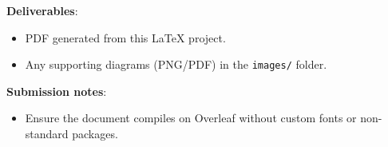 \textbf{Deliverables}:
\begin{itemize}
  \item PDF generated from this \LaTeX{} project.
  \item Any supporting diagrams (PNG/PDF) in the \texttt{images/} folder.
\end{itemize}

\textbf{Submission notes}:
\begin{itemize}
  \item Ensure the document compiles on Overleaf without custom fonts or non-standard packages.
\end{itemize}
